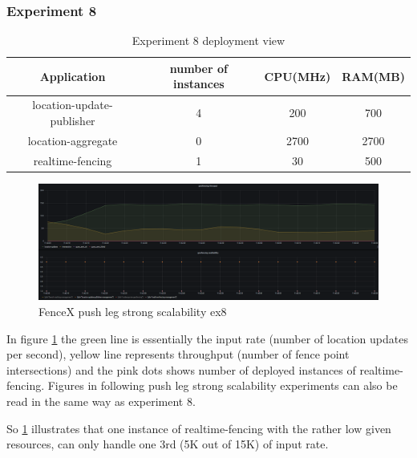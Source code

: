 \documentclass[a4]{report}
\begin{document}
    \clearpage

    \subsubsection{Experiment 8}
    \begin{table}[h!]
        \centering
        \begin{tabular}{|c|c|c|c|}
            \hline
            Application               & number of instances & CPU(MHz) & RAM(MB) \\
            \hline
            location-update-publisher & 4                   & 200      & 700     \\
            location-aggregate        & 0                   & 2700     & 2700    \\
            realtime-fencing          & 1                   & 30       & 500     \\
            \hline
        \end{tabular}
        \caption{Experiment 8 deployment view}
        \label{table:ex8-dv}
    \end{table}

    \begin{figure}[h!]
        \caption{FenceX push leg strong scalability ex8}
        \label{fig:ex8}
        \includegraphics[scale=0.4]{images/evaluation/ex8-benchmarking-ongoing-2per4sec.png}
    \end{figure}

    In figure \ref{fig:ex8} the green line is essentially the input rate (number of location updates per second),
    yellow line represents throughput (number of fence point intersections) and the pink dots shows number of
    deployed instances of realtime-fencing.
    Figures in following push leg strong scalability experiments can also be read in the same way as experiment 8.

    So \ref{fig:ex8} illustrates that one instance of realtime-fencing with the rather low given resources, can only
    handle one 3rd (5K out of 15K) of input rate.
\end{document}

